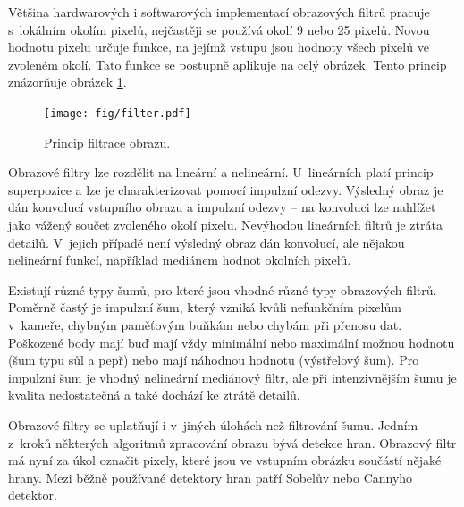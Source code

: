 Většina hardwarových i softwarových implementací obrazových filtrů pracuje s~lokálním okolím pixelů, nejčastěji se používá okolí 9 nebo 25 pixelů. Novou hodnotu pixelu určuje funkce, na jejímž vstupu jsou hodnoty všech pixelů ve zvoleném okolí. Tato funkce se postupně aplikuje na celý obrázek. Tento princip znázorňuje obrázek \ref{obrIFokoli}.

\begin{figure}[htb]
    \centering\texttt{[image: fig/filter.pdf]}
    \caption{Princip filtrace obrazu.}
    \label{obrIFokoli}
\end{figure}

Obrazové filtry lze rozdělit na lineární a nelineární. U~lineárních platí princip superpozice a lze je charakterizovat pomocí impulzní odezvy. Výsledný obraz je dán konvolucí vstupního obrazu a impulzní odezvy -- na konvoluci lze nahlížet jako vážený součet zvoleného okolí pixelu. Nevýhodou lineárních filtrů je ztráta detailů. V~jejich případě není výsledný obraz dán konvolucí, ale nějakou nelineární funkcí, například mediánem hodnot okolních pixelů.

Existují různé typy šumů, pro které jsou vhodné různé typy obrazových filtrů. Poměrně častý je impulzní šum, který vzniká kvůli nefunkčním pixelům v~kameře, chybným paměťovým buňkám nebo chybám při přenosu dat. Poškozené body mají buď mají vždy minimální nebo maximální možnou hodnotu (šum typu sůl a pepř) nebo mají náhodnou hodnotu (výstřelový šum). Pro impulzní šum je vhodný nelineární mediánový filtr, ale při intenzivnějším šumu je kvalita nedostatečná a také dochází ke ztrátě detailů.

Obrazové filtry se uplatňují i v~jiných úlohách než filtrování šumu. Jedním z~kroků některých algoritmů zpracování obrazu bývá detekce hran. Obrazový filtr má nyní za úkol označit pixely, které jsou ve vstupním obrázku součástí nějaké hrany. Mezi běžně používané detektory hran patří Sobelův nebo Cannyho detektor.

